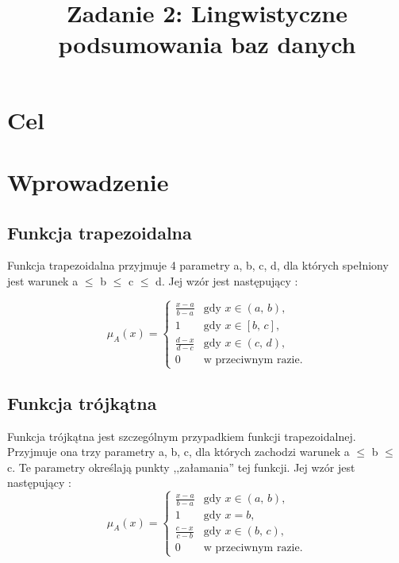 \documentclass{classrep}
\author{
	\studentinfo{Radosław Grela}{216769} \and
	\studentinfo{Jakub Wąchała}{216914} 
}
\title{Zadanie 2: Lingwistyczne podsumowania baz danych}
\begin{document}
	\maketitle
	
	\section{Cel} %
	
	
	\section{Wprowadzenie} %
	
	\subsection{Funkcja trapezoidalna}
	Funkcja trapezoidalna przyjmuje 4 parametry a, b, c, d, dla których spełniony jest warunek a $\leq$ b $\leq$ c $\leq$ d. Jej wzór jest następujący \cite{anbook}: 
	
	\begin{equation}
	\mu_A(x) = \begin{cases}
	\frac{x-a}{b-a} & \mbox{gdy } x \in (a,\, b), \\
	1                 & \mbox{gdy } x \in [b,\, c], \\
	\frac{d-x}{d-c} & \mbox{gdy } x \in (c,\, d), \\
	0                 & \mbox{w przeciwnym razie}.
	\end{cases}
	\end{equation}
	
	
	\subsection{Funkcja trójkątna}
	Funkcja trójkątna jest szczególnym przypadkiem funkcji trapezoidalnej. Przyjmuje ona trzy parametry a, b, c, dla których zachodzi warunek a $\leq$ b $\leq$ c. Te parametry określają punkty ,,załamania'' tej funkcji. Jej wzór jest następujący \cite{funkcje}: 
	\begin{equation}
	\mu_A(x) = \begin{cases}
	\frac{x-a}{b-a} & \mbox{gdy } x \in (a,\, b), \\
	1                 & \mbox{gdy } x = b, \\
	\frac{c-x}{c-b} & \mbox{gdy } x \in (b,\, c), \\
	0                 & \mbox{w przeciwnym razie}.
	\end{cases}
	\end{equation}
	
\end{document}
